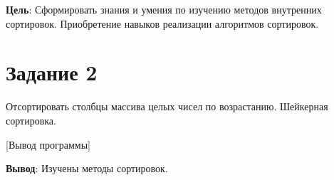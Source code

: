 \documentclass{bsuir}
\begin{document}

\textbf{Цель}: Сформировать знания и умения по изучению методов внутренних
сортировок. Приобретение навыков реализации алгоритмов сортировок.

\section*{Задание 2}

Отсортировать столбцы массива целых чисел по возрастанию. Шейкерная сортировка.


[Вывод программы]

\textbf{Вывод}: Изучены методы сортировок.
\end{document}
